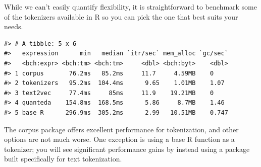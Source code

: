 \documentclass[
]{krantz}
\makeatletter
\newenvironment{Shaded}{\begin{snugshade}}{\end{snugshade}}
\newcommand{\AttributeTok}[1]{\textcolor[rgb]{0.77,0.63,0.00}{#1}}
\newcommand{\ConstantTok}[1]{\textcolor[rgb]{0.00,0.00,0.00}{#1}}
\newcommand{\DecValTok}[1]{\textcolor[rgb]{0.00,0.00,0.81}{#1}}
\newcommand{\FunctionTok}[1]{\textcolor[rgb]{0.00,0.00,0.00}{#1}}
\newcommand{\NormalTok}[1]{#1}
\newcommand{\OtherTok}[1]{\textcolor[rgb]{0.56,0.35,0.01}{#1}}
\newcommand{\SpecialCharTok}[1]{\textcolor[rgb]{0.00,0.00,0.00}{#1}}
\newcommand{\StringTok}[1]{\textcolor[rgb]{0.31,0.60,0.02}{#1}}
\newenvironment{kframe}{%
\medskip{}
\setlength{\fboxsep}{.8em}
 \def\at@end@of@kframe{}%
 \ifinner\ifhmode%
  \def\at@end@of@kframe{\end{minipage}}%
  \begin{minipage}{\columnwidth}%
 \fi\fi%
 \def\FrameCommand##1{\hskip\@totalleftmargin \hskip-\fboxsep
 \colorbox{shadecolor}{##1}\hskip-\fboxsep
     \hskip-\linewidth \hskip-\@totalleftmargin \hskip\columnwidth}%
 \MakeFramed {\advance\hsize-\width
   \@totalleftmargin\z@ \linewidth\hsize
   \@setminipage}}%
 {\par\unskip\endMakeFramed%
 \at@end@of@kframe}
\renewenvironment{Shaded}{\begin{kframe}}{\end{kframe}}
\makeatother
\begin{document}
While we can't easily quantify flexibility, it is straightforward to benchmark some of the tokenizers available in R so you can pick the one that best suits your needs.

\begin{Shaded}
\end{Shaded}

\begin{verbatim}
#> # A tibble: 5 x 6
#>   expression      min   median `itr/sec` mem_alloc `gc/sec`
#>   <bch:expr> <bch:tm> <bch:tm>     <dbl> <bch:byt>    <dbl>
#> 1 corpus       76.2ms   85.2ms     11.7     4.59MB    0    
#> 2 tokenizers   95.2ms  104.4ms      9.65    1.01MB    1.07 
#> 3 text2vec     77.4ms     85ms     11.9    19.21MB    0    
#> 4 quanteda    154.8ms  168.5ms      5.86     8.7MB    1.46 
#> 5 base R      296.9ms  305.2ms      2.99   10.51MB    0.747
\end{verbatim}

The corpus package \citep{Perry2020} offers excellent performance for tokenization, and other options are not much worse. One exception is using a base R function as a tokenizer; you will see significant performance gains by instead using a package built specifically for text tokenization.
\end{document}
